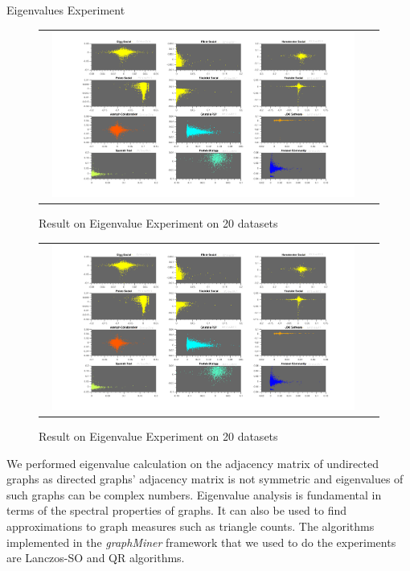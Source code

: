 Eigenvalues Experiment

\begin{figure}[H]
\begin{center}
\begin{tabular}{cc}
     \includegraphics[width=0.95\textwidth]{FIG/eigenv1.png}
\end{tabular}
\caption{Result on Eigenvalue Experiment on 20 datasets}
\end{center}
\end{figure}

\begin{figure}[H]
\begin{center}
\begin{tabular}{cc}
     \includegraphics[width=0.95\textwidth]{FIG/eigenv1.png}
\end{tabular}
\caption{Result on Eigenvalue Experiment on 20 datasets}
\end{center}
\end{figure}

We performed eigenvalue calculation on the adjacency matrix of undirected graphs as directed graphs' adjacency matrix is not symmetric and eigenvalues of such graphs can be complex numbers. Eigenvalue analysis is fundamental in terms of the spectral properties of graphs. It can also be used to find approximations to graph measures such as triangle counts.  The algorithms implemented in the {\em graphMiner} framework that we used to do the experiments are Lanczos-SO and QR algorithms.

